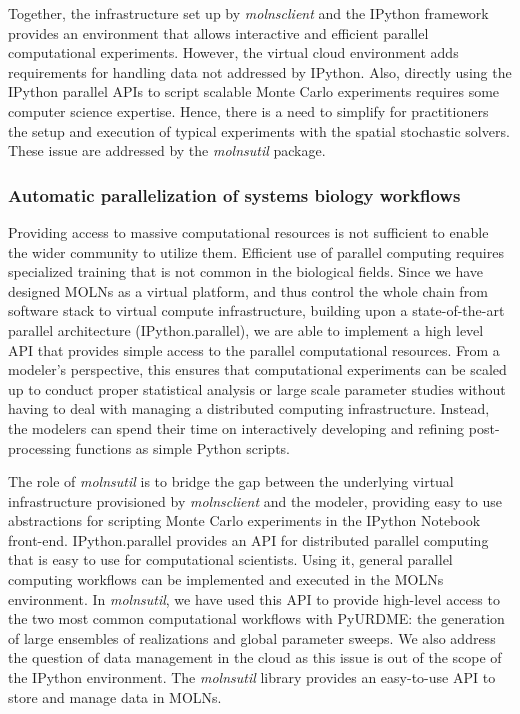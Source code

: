 \documentclass[final,leqno,onefignum,onetabnum]{siamltex1213}
\begin{document}
Together, the infrastructure set up by \emph{molnsclient} and the IPython framework provides an environment that allows interactive and efficient parallel computational experiments. However, the virtual cloud environment adds requirements for handling data not addressed by IPython. Also, directly using the IPython parallel APIs to script scalable Monte Carlo experiments requires some computer science expertise. Hence, there is a need to simplify for practitioners the setup and execution of typical experiments with the spatial stochastic solvers. These issue are addressed by the \emph{molnsutil} package.    


\subsubsection{Automatic parallelization of systems biology workflows}
Providing access to massive computational resources is not sufficient to enable the wider community to utilize them.  Efficient use of parallel computing requires specialized training that is not common in the biological fields. Since we have designed MOLNs as a virtual platform, and thus control the whole chain from software stack to virtual compute infrastructure, building upon a state-of-the-art parallel architecture (IPython.parallel), we are able to implement a high level API that provides simple access to the parallel computational resources. From a modeler's perspective, this ensures that computational experiments can be scaled up to conduct proper statistical analysis or large scale parameter studies without having to deal with managing a distributed computing infrastructure. Instead, the modelers can spend their time on interactively developing and refining post-processing functions as simple Python scripts.

The role of \emph{molnsutil} is to bridge the gap between the underlying virtual infrastructure provisioned by \emph{molnsclient} and the modeler, providing easy to use abstractions for scripting Monte Carlo experiments in the IPython Notebook front-end.  IPython.parallel provides an API for distributed parallel computing that is easy to use for computational scientists. Using it, general parallel computing workflows can be implemented and executed in the MOLNs environment. In \emph{molnsutil}, we have used this API to provide high-level access to the two most common computational workflows with PyURDME: the generation of large ensembles of realizations and global parameter sweeps. We also address the question of data management in the cloud as this issue is out of the scope of the IPython environment. The \emph{molnsutil} library provides an easy-to-use API to store and manage data in MOLNs. 
\end{document}
